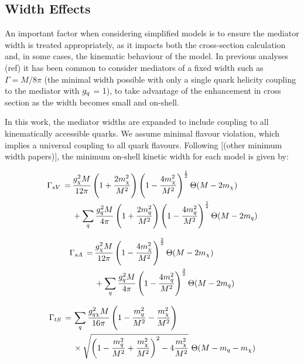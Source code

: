 \subsection{Width Effects}

An important factor when considering simplified models is to ensure the mediator width is treated appropriately, as it impacts both the cross-section calculation and, in some cases, the kinematic behaviour of the model. In previous analyses (ref) it has been common to consider mediators of a fixed width such as $\Gamma = M/8 \pi$  (the minimal width possible with only a single quark helicity coupling to the mediator with $g_q$ = 1), to take advantage of the enhancement in cross section as the width becomes small and on-shell.

In this work, the mediator widths are expanded to include coupling to all kinematically accessible quarks. We assume minimal flavour violation, which implies a universal coupling to all quark flavours. Following $[$(other minimum width papers)$]$, the minimum on-shell kinetic width for each model is given by:

\begin{equation}
  \begin{split}
    \Gamma_{sV} \, = \, & \frac{g_{\chi}^2 M}{12\pi}\left(1 + \frac{2 m_{\chi}^{2}}{M^{2}}\right)\left(1 - \frac{4 m_{\chi}^{2}}{M^{2}}\right)^{\frac{1}{2}} \Theta(M-2 m_{\chi}) \\
                  & + \sum_{\substack{q}}\frac{g_q^2M}{4\pi}\left(1 + \frac{2m_{q}^{2}}{M^{2}}\right)\left(1 - \frac{4m_{q}^{2}}{M^{2}}\right)^{\frac{1}{2}} \Theta(M-2m_q)
  \end{split}
\end{equation}

\begin{equation}
  \begin{split}
    \Gamma_{sA} \, = \, & \frac{g_{\chi}^2 M}{12\pi}\left(1 - \frac{4 m_{\chi}^{2}}{M^{2}}\right)^{\frac{3}{2}} \Theta(M-2 m_{\chi}) \\
                  & + \sum_{\substack{q}}\frac{g_q^2 M}{4\pi}\left(1 - \frac{4m_{q}^{2}}{M^{2}}\right)^{\frac{3}{2}} \Theta(M-2m_q) \\
  \end{split}
\end{equation}

\begin{equation}
  \begin{split}
    \Gamma_{tS} \, = \, & \sum_{\substack{q}} \frac{g_{q \chi}^2M}{16\pi}\left(1 - \frac{m_{q}^{2}}{M^{2}} - \frac{m_{\chi}^{2}}{M^{2}}\right) \\
                  & \times \sqrt{\left(1 - \frac{m_{q}^{2}}{M^{2}} + \frac{m_{\chi}^{2}}{M^{2}}\right)^{2} - 4\frac{m_{\chi}^{2}}{M^{2}}} \,\, \Theta(M-m_q- m_{\chi}) \\
  \end{split}
\end{equation}

